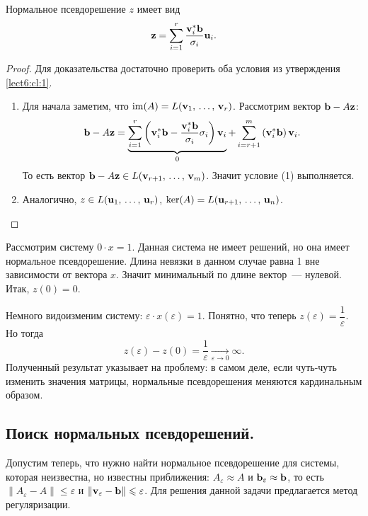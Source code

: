\begin{claim}
    Нормальное псевдорешение $z$ имеет вид  
    \[
        \mathbf{z} = \sum_{i=1}^r \dfrac{\mathbf{v}_i^*\mathbf{b}}{\sigma_i}\mathbf{u}_i.    
    \]

    \begin{proof}
        
        Для доказательства достаточно проверить оба условия из утверждения \ref{lect6:cl:1}. 
        \begin{enumerate}[label=(\arabic*)]
            \item Для начала заметим, что $\operatorname{im}(A)=L(\mathbf{v}_1,\,\ldots,\,\mathbf{v}_r)$. Рассмотрим вектор $\mathbf{b}-A\mathbf{z}$:
            \[
                \mathbf{b}-A\mathbf{z}=\underbrace{\sum_{i=1}^r \left(\mathbf{v}^*_i\mathbf{b}-\dfrac{\mathbf{v}_i^*\mathbf{b}}{\sigma_i}\sigma_i\right)\mathbf{v}_i}_0
                +\sum_{i=r+1}^m \left(\mathbf{v}_i^*\mathbf{b}\right)\mathbf{v}_i.
            \]
            То есть вектор $\mathbf{b}-A\mathbf{z}\in L(\mathbf{v}_{r+1},\,\ldots,\, \mathbf{v}_m)$. Значит условие (1) выполняется.
            \item Аналогично, $z\in L(\mathbf{u}_1,\,\ldots,\, \mathbf{u}_r)$, $\ker(A)=L(\mathbf{u}_{r+1},\,\ldots,\, \mathbf{u}_n)$. 
        \end{enumerate}

    \end{proof}
\end{claim}

\begin{exercise}
    Рассмотрим систему $0\cdot x = 1$. Данная система не имеет решений, но она имеет нормальное псевдорешение. Длина невязки в данном случае равна 1 вне зависимости от вектора 
    $x$. Значит минимальный по длине вектор~--- нулевой. Итак, $z(0)=0$.

    Немного видоизменим систему: $\varepsilon\cdot x(\varepsilon) = 1$. 
    Понятно, что теперь $z(\varepsilon)=\dfrac{1}{\varepsilon}$. Но тогда 
    \[
        z(\varepsilon) - z(0)=\dfrac{1}{\varepsilon}\xrightarrow[\varepsilon\to 0]{}\infty.
    \]
    Полученный результат указывает на проблему: в самом деле, если чуть-чуть изменить значения матрицы, нормальные псевдорешения меняются кардинальным образом.
\end{exercise}

\subsection{Поиск нормальных псевдорешений.}
Допустим теперь, что нужно найти нормальное псевдорешение для системы, которая неизвестна, 
но известны приближения: $A_{\varepsilon}\approx A$ и $\mathbf{b}_{\varepsilon}\approx \mathbf{b}$, то есть 
$\|A_{\varepsilon}-A\|\leqslant \varepsilon$ и $\|\mathbf{v}_{\varepsilon}-\mathbf{b}\|\leqslant \varepsilon$.
Для решения данной задачи предлагается метод регуляризации.

